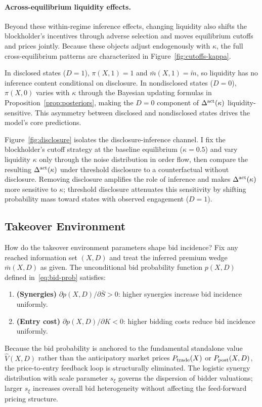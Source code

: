 \documentclass[11pt]{article}
\newcommand{\1}{\mathbf{1}}
\begin{document}
\paragraph{Across-equilibrium liquidity effects.}
Beyond these within-regime inference effects, changing liquidity also shifts the blockholder's incentives through adverse selection and moves equilibrium cutoffs and prices jointly. Because these objects adjust endogenously with $\kappa$, the full cross-equilibrium patterns are characterized in Figure~\ref{fig:cutoffs-kappa}.

In disclosed states ($D=1$), $\pi(X,1)=1$ and $\bar{m}(X,1)=\tilde{m}$, so liquidity has no inference content conditional on disclosure. In nondisclosed states ($D=0$), $\pi(X,0)$ varies with $\kappa$ through the Bayesian updating formulas in Proposition~\ref{prop:posteriors}, making the $D=0$ component of $\Delta^{\textup{act}}(\kappa)$ liquidity-sensitive. This asymmetry between disclosed and nondisclosed states drives the model's core predictions.

Figure~\ref{fig:disclosure} isolates the disclosure-inference channel. I fix the blockholder's cutoff strategy at the baseline equilibrium ($\kappa=0.5$) and vary liquidity $\kappa$ only through the noise distribution in order flow, then compare the resulting $\Delta^{\textup{act}}(\kappa)$ under threshold disclosure to a counterfactual without disclosure. Removing disclosure amplifies the role of inference and makes $\Delta^{\textup{act}}(\kappa)$ more sensitive to $\kappa$; threshold disclosure attenuates this sensitivity by shifting probability mass toward states with observed engagement ($D=1$).

%
\subsection{Takeover Environment}
%

How do the takeover environment parameters shape bid incidence? Fix any reached information set $(X,D)$ and treat the inferred premium wedge $\bar{m}(X,D)$ as given. The unconditional bid probability function $p(X,D)$ defined in~\eqref{eq:bid-prob} satisfies:
\begin{enumerate}[label=\textup{(\alph*)},leftmargin=2em]
\item \textbf{(Synergies)} $\partial p(X,D) / \partial \bar{S} > 0$: higher synergies increase bid incidence uniformly.
\item \textbf{(Entry cost)} $\partial p(X,D) / \partial K < 0$: higher bidding costs reduce bid incidence uniformly.
\end{enumerate}
Because the bid probability is anchored to the fundamental standalone value $\hat{V}(X,D)$ rather than the anticipatory market prices $P_{\textup{trade}}(X)$ or $P_{\textup{post}}(X,D)$, the price-to-entry feedback loop is structurally eliminated. The logistic synergy distribution with scale parameter $s_\xi$ governs the dispersion of bidder valuations; larger $s_\xi$ increases overall bid heterogeneity without affecting the feed-forward pricing structure.
\end{document}
